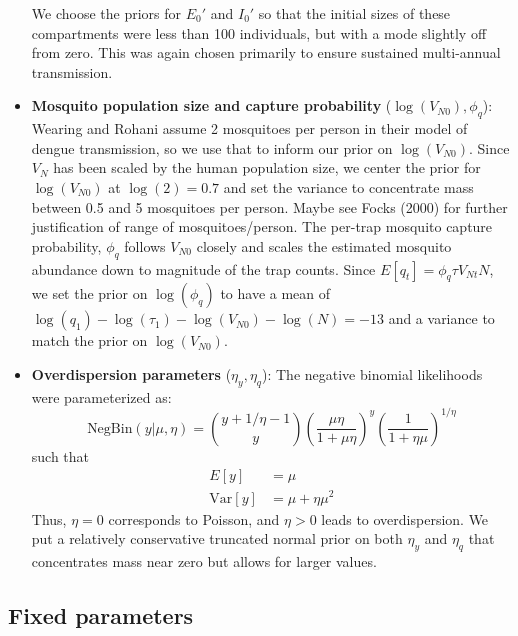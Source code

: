 \documentclass[12pt,letterpaper]{article}
\begin{document}
\begin{itemize}
We choose the priors for $E_0'$ and $I_0'$ so that the initial sizes of these compartments were less than 100 individuals, but with a mode slightly off from zero.
This was again chosen primarily to ensure sustained multi-annual transmission.
\\
\item \textbf{Mosquito population size and capture probability} ($\log(V_{N0}), \phi_q$): Wearing and Rohani \cite{Wearing2006} assume 2 mosquitoes per person in their model of dengue transmission, so we use that to inform our prior on $\log(V_{N0})$.
Since $V_{N}$ has been scaled by the human population size, we center the prior for $\log(V_{N0})$ at $\log(2) = 0.7$ and set the variance to concentrate mass between 0.5 and 5 mosquitoes per person.
Maybe see Focks (2000) for further justification of range of mosquitoes/person.
The per-trap mosquito capture probability, $\phi_q$ follows $V_{N0}$ closely and scales the estimated mosquito abundance down to magnitude of the trap counts.
Since $ E[q_t] = \phi_q \tau V_{Nt} N$, we set the prior on $\log(\phi_q)$ to have a mean of $\log(q_1) - \log(\tau_1) - \log(V_{N0}) - \log(N) = -13$ and a variance to match the prior on $\log(V_{N0})$.
\\
\item \textbf{Overdispersion parameters} ($\eta_y, \eta_q$): The negative binomial likelihoods were parameterized as:
\begin{equation}
\text{NegBin}(y | \mu, \eta) = {y + 1/\eta -1 \choose y}\left(\frac{\mu\eta}{1 + \mu\eta}\right)^y\left(\frac{1}{1+\eta\mu}\right)^{1/\eta}
\end{equation}
such that
\begin{align}
E[y] & = \mu\\
\text{Var}[y] &= \mu + \eta\mu^2
\end{align}
Thus, $\eta = 0$ corresponds to Poisson, and $\eta > 0$ leads to overdispersion.
We put a relatively conservative truncated normal prior on both $\eta_y$ and $\eta_q$ that concentrates mass near zero but allows for larger values.
\end{itemize}

\subsection*{Fixed parameters}
\end{document}
